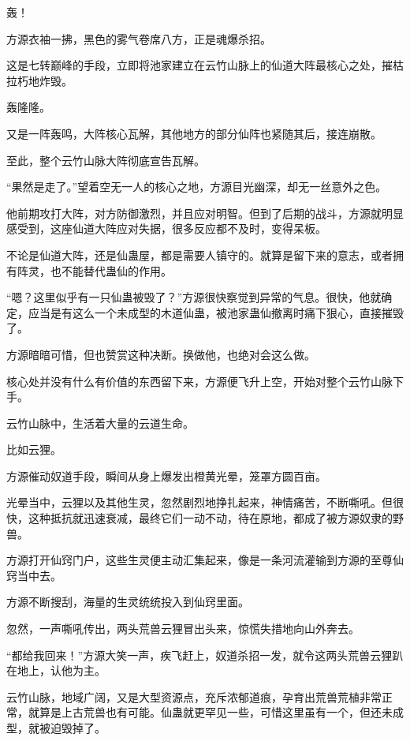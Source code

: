 
\begin{this_body}

轰！

方源衣袖一拂，黑色的雾气卷席八方，正是魂爆杀招。

这是七转巅峰的手段，立即将池家建立在云竹山脉上的仙道大阵最核心之处，摧枯拉朽地炸毁。

轰隆隆。

又是一阵轰鸣，大阵核心瓦解，其他地方的部分仙阵也紧随其后，接连崩散。

至此，整个云竹山脉大阵彻底宣告瓦解。

“果然是走了。”望着空无一人的核心之地，方源目光幽深，却无一丝意外之色。

他前期攻打大阵，对方防御激烈，并且应对明智。但到了后期的战斗，方源就明显感受到，这座仙道大阵应对失据，很多反应都不及时，变得呆板。

不论是仙道大阵，还是仙蛊屋，都是需要人镇守的。就算是留下来的意志，或者拥有阵灵，也不能替代蛊仙的作用。

“嗯？这里似乎有一只仙蛊被毁了？”方源很快察觉到异常的气息。很快，他就确定，应当是有这么一个未成型的木道仙蛊，被池家蛊仙撤离时痛下狠心，直接摧毁了。

方源暗暗可惜，但也赞赏这种决断。换做他，也绝对会这么做。

核心处并没有什么有价值的东西留下来，方源便飞升上空，开始对整个云竹山脉下手。

云竹山脉中，生活着大量的云道生命。

比如云狸。

方源催动奴道手段，瞬间从身上爆发出橙黄光晕，笼罩方圆百亩。

光晕当中，云狸以及其他生灵，忽然剧烈地挣扎起来，神情痛苦，不断嘶吼。但很快，这种抵抗就迅速衰减，最终它们一动不动，待在原地，都成了被方源奴隶的野兽。

方源打开仙窍门户，这些生灵便主动汇集起来，像是一条河流灌输到方源的至尊仙窍当中去。

方源不断搜刮，海量的生灵统统投入到仙窍里面。

忽然，一声嘶吼传出，两头荒兽云狸冒出头来，惊慌失措地向山外奔去。

“都给我回来！”方源大笑一声，疾飞赶上，奴道杀招一发，就令这两头荒兽云狸趴在地上，认他为主。

云竹山脉，地域广阔，又是大型资源点，充斥浓郁道痕，孕育出荒兽荒植非常正常，就算是上古荒兽也有可能。仙蛊就更罕见一些，可惜这里虽有一个，但还未成型，就被迫毁掉了。


\end{this_body}
